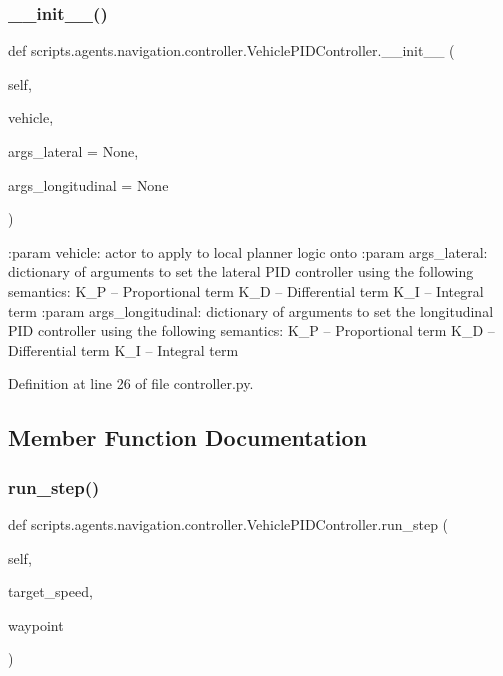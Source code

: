 \subsubsection{\texorpdfstring{\+\_\+\+\_\+init\+\_\+\+\_\+()}{\_\_init\_\_()}}
{\footnotesize\ttfamily def scripts.\+agents.\+navigation.\+controller.\+Vehicle\+P\+I\+D\+Controller.\+\_\+\+\_\+init\+\_\+\+\_\+ (\begin{DoxyParamCaption}\item[{}]{self,  }\item[{}]{vehicle,  }\item[{}]{args\+\_\+lateral = {\ttfamily None},  }\item[{}]{args\+\_\+longitudinal = {\ttfamily None} }\end{DoxyParamCaption})}

\begin{DoxyVerb}:param vehicle: actor to apply to local planner logic onto
:param args_lateral: dictionary of arguments to set the lateral PID controller using the following semantics:
             K_P -- Proportional term
             K_D -- Differential term
             K_I -- Integral term
:param args_longitudinal: dictionary of arguments to set the longitudinal PID controller using the following
semantics:
             K_P -- Proportional term
             K_D -- Differential term
             K_I -- Integral term
\end{DoxyVerb}
 

Definition at line 26 of file controller.\+py.



\subsection{Member Function Documentation}
\mbox{\label{classscripts_1_1agents_1_1navigation_1_1controller_1_1VehiclePIDController_a4f79d7214620c693ee175895ab95c8e7}} 
\subsubsection{\texorpdfstring{run\+\_\+step()}{run\_step()}}
{\footnotesize\ttfamily def scripts.\+agents.\+navigation.\+controller.\+Vehicle\+P\+I\+D\+Controller.\+run\+\_\+step (\begin{DoxyParamCaption}\item[{}]{self,  }\item[{}]{target\+\_\+speed,  }\item[{}]{waypoint }\end{DoxyParamCaption})}

